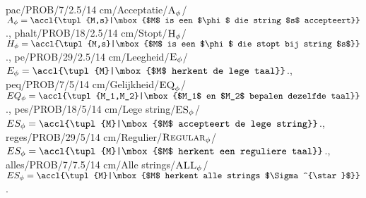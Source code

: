 pac/PROB/7/2.5/14 cm/Acceptatie/$\mbox{\textsc{A}}_{\phi}$/{$A_{\phi}=\accl{\tupl{M,s}|\mbox{$M$ is een $\phi$ die string $s$ accepteert}}$.},
phalt/PROB/18/2.5/14 cm/Stopt/$\mbox{\textsc{H}}_{\phi}$/{$H_{\phi}=\accl{\tupl{M,s}|\mbox{$M$ is een $\phi$ die stopt bij string $s$}}$.},
pe/PROB/29/2.5/14 cm/Leegheid/$\mbox{\textsc{E}}_{\phi}$/{$E_{\phi}=\accl{\tupl{M}|\mbox{$M$ herkent de lege taal}}$.},
peq/PROB/7/5/14 cm/Gelijkheid/$\mbox{\textsc{EQ}}_{\phi}$/{$EQ_{\phi}=\accl{\tupl{M_1,M_2}|\mbox{$M_1$ en $M_2$ bepalen dezelfde taal}}$.},
pes/PROB/18/5/14 cm/Lege string/$\mbox{\textsc{ES}}_{\phi}$/{$ES_{\phi}=\accl{\tupl{M}|\mbox{$M$ accepteert de lege string}}$.},
reges/PROB/29/5/14 cm/Regulier/$\mbox{\textsc{Regular}}_{\phi}$/{$ES_{\phi}=\accl{\tupl{M}|\mbox{$M$ herkent een reguliere taal}}$.},
alles/PROB/7/7.5/14 cm/Alle strings/$\mbox{\textsc{ALL}}_{\phi}$/{$ES_{\phi}=\accl{\tupl{M}|\mbox{$M$ herkent alle strings $\Sigma^{\star}$}}$.}